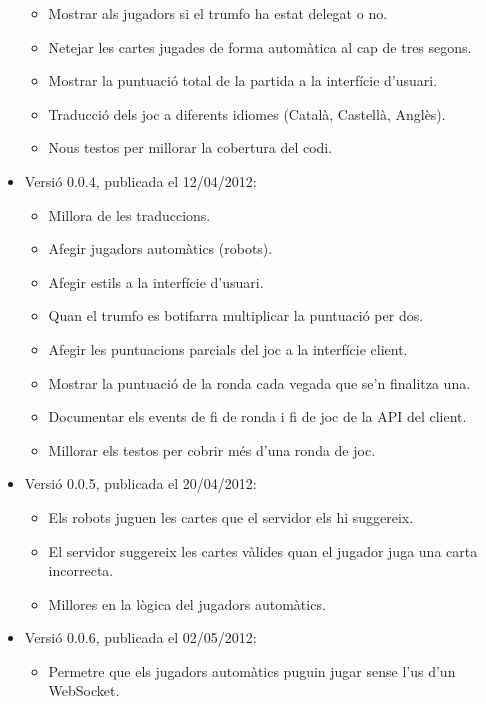 \begin{itemize}
{    \begin{itemize}
        \item{Mostrar als jugadors si el trumfo ha estat delegat o no.}
        \item{Netejar les cartes jugades de forma automàtica al cap de tres segons.}
        \item{Mostrar la puntuació total de la partida a la interfície d'usuari.}
        \item{Traducció dels joc a diferents idiomes (Català, Castellà, Anglès).}
        \item{Nous testos per millorar la cobertura del codi.}
    \end{itemize}
}
\item{Versió 0.0.4, publicada el 12/04/2012: 
    \begin{itemize}
        \item{Millora de les traduccions.}
        \item{Afegir jugadors automàtics (robots).}
        \item{Afegir estils a la interfície d'usuari. }
        \item{Quan el trumfo es botifarra multiplicar la puntuació per dos.}
        \item{Afegir les puntuacions parcials del joc a la interfície client.}
        \item{Mostrar la puntuació de la ronda cada vegada que se'n finalitza una.}
        \item{Documentar els events de fi de ronda i fi de joc de la API del client.}
        \item{Millorar els testos per cobrir més d'una ronda de joc.}
    \end{itemize}
}
\item{Versió 0.0.5, publicada el 20/04/2012:
    \begin{itemize}
        \item{Els robots juguen les cartes que el servidor els hi suggereix.}
        \item{El servidor suggereix les cartes vàlides quan el jugador juga una carta incorrecta.}
        \item{Millores en la lògica del jugadors automàtics.}
    \end{itemize}
}
\item{Versió 0.0.6, publicada el 02/05/2012:
    \begin{itemize}
        \item{Permetre que els jugadors automàtics puguin jugar sense l'us d'un WebSocket.}

\end{itemize}}
\end{itemize}
